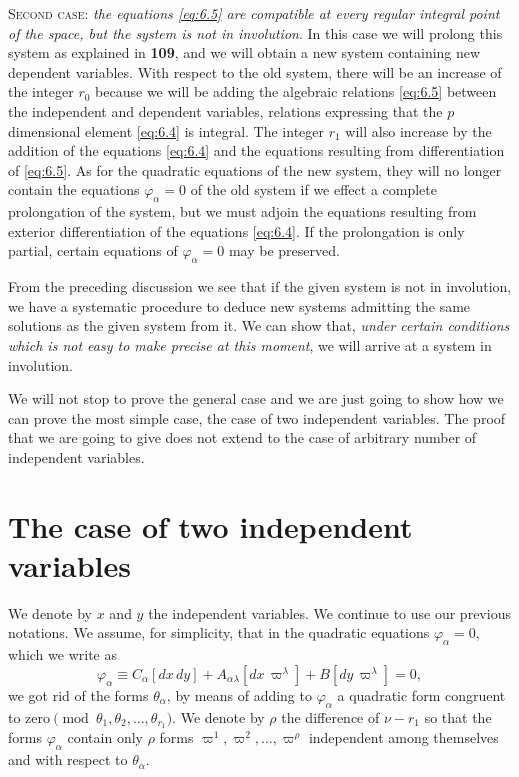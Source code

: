 \documentclass[leqno,11pt]{book}
\numberwithin{equation}{chapter}
\theoremstyle{shape1}
\theoremstyle{shape0}
\theoremstyle{shape2}
\theoremstyle{definition}
\begin{document}
\vspace{12pt}\textsc{Second case}: \emph{the equations \eqref{eq:6.5} are compatible at every regular integral point of the space, but the system is not in involution}. In this case we will prolong this system as explained in \textsection\textbf{109}, and we will obtain a new system containing new dependent variables. With respect to the old system, there will be an increase of the integer $r_{0}$ because we will be adding  the algebraic relations \eqref{eq:6.5} between the independent and dependent variables, relations expressing that the $p$ dimensional element \eqref{eq:6.4} is integral. The integer $r_{1}$ will also increase by the addition of the equations \eqref{eq:6.4} and the equations resulting from differentiation of \eqref{eq:6.5}. As for the quadratic equations of the new system, they will no longer contain the equations $\varphi_{\alpha}=0$ of the old system if we effect a complete prolongation of the system, but we must adjoin the equations resulting from exterior differentiation of the equations \eqref{eq:6.4}. If the prolongation is only partial, certain equations of $\varphi_{\alpha}=0$ may be preserved.


\vspace{12pt}\fsec From the preceding discussion we see that if the given system is not in involution, we have a systematic procedure to deduce new systems admitting the same solutions as the given system from it. We can show that, \emph{under certain conditions which is not easy to make precise at this moment},  we will arrive at a system in involution.

We will not stop to prove the general case and we are just going to show how we can prove the most simple case, the case of two independent variables. The proof that we are going to give does not extend to the case of arbitrary number of independent variables.


\section{The case of two independent variables}
\label{sec:case-two-independent-1}

\fsec We denote by $x$ and $y$ the independent variables. We continue to use our previous notations. We assume, for simplicity, that in the quadratic equations $\varphi_{\alpha}=0$, which we write as
\begin{equation}
  \label{eq:6.6}
  \varphi_{\alpha}\equiv C_{\alpha}[dx\,dy]+A_{\alpha\lambda}[dx\,\varpi^{\lambda}]+B[dy\,\varpi^{\lambda}]=0,
\end{equation}
we got rid of the forms $\theta_{\alpha}$, by means of adding to $\varphi_{\alpha}$ a quadratic form congruent to zero$\pmod{\theta_{1},\theta_{2},\dots,\theta_{r_{1}}}$. We denote by $\rho$ the difference of $\nu-r_{1}$ so that the forms $\varphi_{\alpha}$ contain only $\rho$ forms $\varpi^{1},\varpi^{2},\dots,\varpi^{\rho}$ independent among themselves and with respect to $\theta_{\alpha}$.
\end{document}
